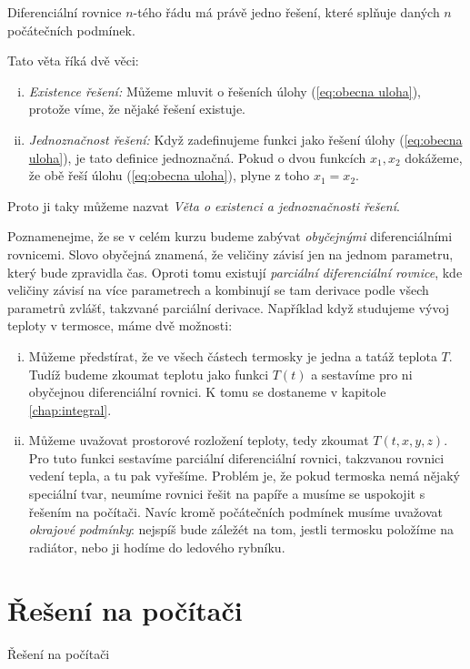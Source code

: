 \begin{věta}
  Diferenciální rovnice $n$-tého řádu má právě jedno řešení, které splňuje daných $n$ počátečních podmínek.
\end{věta}

Tato věta říká dvě věci:
\begin{enumerate}[(i)]
	\item \textit{Existence řešení:} Můžeme mluvit o řešeních úlohy (\ref{eq:obecna uloha}), protože víme, že nějaké řešení existuje.
\item \textit{Jednoznačnost řešení:} Když zadefinujeme funkci jako řešení úlohy (\ref{eq:obecna uloha}), je tato definice jednoznačná. Pokud o dvou funkcích $x_1, x_2$ dokážeme, že obě řeší úlohu (\ref{eq:obecna uloha}), plyne z toho $x_1=x_2.$
\end{enumerate}
Proto ji taky můžeme nazvat \textit{Věta o existenci a jednoznačnosti řešení}.

Poznamenejme, že se v celém kurzu budeme zabývat \textit{obyčejnými} diferenciálními rovnicemi. Slovo obyčejná znamená, že veličiny závisí jen na jednom parametru, který bude zpravidla čas. Oproti tomu existují \textit{parciální diferenciální rovnice}, kde veličiny závisí na více parametrech a kombinují se tam derivace podle všech parametrů zvlášť, takzvané parciální derivace. Například když studujeme vývoj teploty v termosce, máme dvě možnosti:
\begin{enumerate}[(i)]
	\item Můžeme předstírat, že ve všech částech termosky je jedna a tatáž teplota $T$. Tudíž budeme zkoumat teplotu jako funkci $T(t)$ a sestavíme pro ni obyčejnou diferenciální rovnici. K tomu se dostaneme v kapitole \ref{chap:integral}.
	\item Můžeme uvažovat prostorové rozložení teploty, tedy zkoumat $T(t,x,y,z)$. Pro tuto funkci sestavíme parciální diferenciální rovnici, takzvanou rovnici vedení tepla, a tu pak vyřešíme. Problém je, že pokud termoska nemá nějaký speciální tvar, neumíme rovnici řešit na papíře a musíme se uspokojit s řešením na počítači. Navíc kromě počátečních podmínek musíme uvažovat \textit{okrajové podmínky}: nejspíš bude záležét na tom, jestli termosku položíme na radiátor, nebo ji hodíme do ledového rybníku.
\end{enumerate}

\section{Řešení na počítači}
\begin{Todo}
  Řešení na počítači
\end{Todo}
